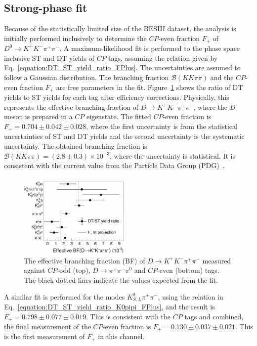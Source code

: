 \documentclass[12pt, a4paper, notitlepage, onecolumn]{article}
\begin{document}
\subsection{Strong-phase fit}
\noindent Because of the statistically limited size of the BESIII dataset, the analysis is initially performed inclusively to determine the $C\!P$-even fraction $F_+$ of $D^0\to K^+K^-\pi^+\pi^-$. A maximum-likelihood fit is performed to the phase space inclusive ST and DT yields of $C\!P$ tags, assuming the relation given by Eq.~\eqref{equation:DT_ST_yield_ratio_FPlus}. The uncertainties are assumed to follow a Gaussian distribution. The branching fraction $\mathcal{B}(KK\pi\pi)$ and the $C\!P$-even fraction $F_+$ are free parameters in the fit. Figure~\ref{figure:FPlus_CP_tags} shows the ratio of DT yields to ST yields for each tag after efficiency corrections. Physically, this represents the effective branching fraction of $D\to K^+K^-\pi^+\pi^-$, where the $D$ meson is prepared in a $C\!P$ eigenstate. The fitted $C\!P$-even fraction is $F_+ = 0.704 \pm 0.042 \pm 0.028$, where the first uncertainty is from the statistical uncertainties of ST and DT yields and the second uncertainty is the systematic uncertainty. The obtained branching fraction is $\mathcal{B}(KK\pi\pi) = (2.8 \pm 0.3)\times 10^{-3}$, where the uncertainty is statistical. It is consistent with the current value from the Particle Data Group (PDG)~\cite{pdg}.

\begin{figure}[htb]
    \centering
    \includegraphics[width=0.5\textwidth]{Plots/CPeven_fraction_combination_CPtags.png}
    \caption{The effective branching fraction (BF) of $D\to K^+K^-\pi^+\pi^-$ measured against $C\!P$-odd (top), $D\to\pi^+\pi^-\pi^0$ and $C\!P$-even (bottom) tags. The black dotted lines indicate the values expected from the fit.}
    \label{figure:FPlus_CP_tags}
\end{figure}

A similar fit is performed for the modes $K^0_{S, L}\pi^+\pi^-$, using the relation in Eq.~\eqref{equation:DT_ST_yield_ratio_K0pipi_FPlus}, and the result is $F_+ = 0.798 \pm 0.077 \pm 0.019$. This is consistent with the $C\!P$ tags and combined, the final measurement of the $C\!P$-even fraction is $F_+ = 0.730 \pm 0.037 \pm 0.021$. This is the first measurement of $F_+$ in this channel.
\end{document}

